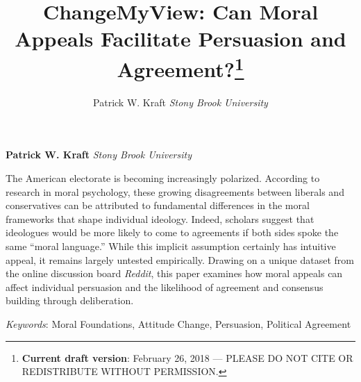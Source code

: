 \documentclass[11pt,]{article}
\title{ChangeMyView: Can Moral Appeals Facilitate Persuasion and Agreement?\thanks{\textbf{Current draft version}: February 26, 2018 --- PLEASE DO NOT CITE
OR REDISTRIBUTE WITHOUT PERMISSION.}  }
\author{\Large Patrick W. Kraft\vspace{0.05in} \newline\normalsize\emph{Stony Brook University}  }
\date{}
\newcommand*{\authorfont}{\fontfamily{phv}\selectfont}
\renewenvironment{abstract}
 {{%
    \setlength{\leftmargin}{0mm}
    \setlength{\rightmargin}{\leftmargin}%
  }%
  \relax}
 {\endlist}
\begin{document}
	
%

{%
\setlength{\parindent}{0pt}
\thispagestyle{plain}
{\fontsize{18}{20}\selectfont\raggedright 
\maketitle  %

}

{
   \vskip 13.5pt\relax \normalsize\fontsize{11}{12} 
\textbf{\authorfont Patrick W. Kraft} \hskip 15pt \emph{\small Stony Brook University}   

}

}








\begin{abstract}

    \hbox{\vrule height .2pt width 39.14pc}

    \vskip 8.5pt %

\noindent The American electorate is becoming increasingly polarized. According to
research in moral psychology, these growing disagreements between
liberals and conservatives can be attributed to fundamental differences
in the moral frameworks that shape individual ideology. Indeed, scholars
suggest that ideologues would be more likely to come to agreements if
both sides spoke the same ``moral language.'' While this implicit
assumption certainly has intuitive appeal, it remains largely untested
empirically. Drawing on a unique dataset from the online discussion
board \emph{Reddit}, this paper examines how moral appeals can affect
individual persuasion and the likelihood of agreement and consensus
building through deliberation.


\vskip 8.5pt \noindent \emph{Keywords}: Moral Foundations, Attitude Change, Persuasion, Political Agreement \par

    \hbox{\vrule height .2pt width 39.14pc}



\end{abstract}


\vskip 6.5pt
\end{document}
